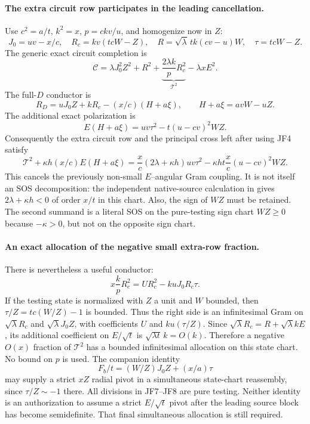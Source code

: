 \paragraph{The extra circuit row participates in the leading cancellation.}
Use $c^2=a/t$, $k^2=x$, $p=ckv/u$, and homogenize now in $Z$:
\[
 J_0=uv-x/c,\quad R_c=kv(tcW-Z),\quad
 R=\sqrt\lambda\,tk(cv-u)W,
 \quad \tau=tcW-Z.
\]
The generic exact circuit completion is
\[
 \mathscr C=\lambda J_0^2Z^2+R^2+
      \underbrace{\frac{2\lambda k}{p}R_c^2}_{\mathcal T^2}
      -\lambda xE^2.
\]
The full-$D$ conductor is
\[
 R_D=uJ_0Z+kR_c-(x/c)(H+a\xi),\qquad
 H+a\xi=avW-uZ.                                  \tag{JF4}
\]
The additional exact polarization is
\[
 E(H+a\xi)=uv\tau^2-t(u-cv)^2WZ.                  \tag{JF5}
\]
Consequently the extra circuit row and the principal cross left after
using JF4 satisfy
\[
 \mathcal T^2+\kappa h(x/c)E(H+a\xi)
 =\frac{x}{c}(2\lambda+\kappa h)uv\tau^2
      -\kappa ht\frac{x}{c}(u-cv)^2WZ.             \tag{JF6}
\]
This cancels the previously non-small $E$--angular Gram coupling.
It is not itself an SOS decomposition: the independent native-source
calculation in 
gives $2\lambda+\kappa h<0$ of order $x/t$ in this chart.
Also, the sign of $WZ$ must be retained. The second summand is a
literal SOS on the pure-testing sign chart $WZ\ge0$ because
$-\kappa>0$, but not on the opposite sign chart.

\paragraph{An exact allocation of the negative small extra-row fraction.}
There is nevertheless a useful conductor:
\[
 x\frac{k}{p}R_c^2
          =U R_c^2-kuJ_0R_c\tau.                   \tag{JF7}
\]
If the testing state is normalized with $Z$ a unit and $W$ bounded,
then $\tau/Z=tc(W/Z)-1$ is bounded. Thus the right side is an
infinitesimal Gram on $\sqrt\lambda R_c$ and
$\sqrt\lambda J_0Z$, with coefficients $U$ and
$ku(\tau/Z)$. Since
$\sqrt\lambda R_c=R+\sqrt\lambda kE$, its additional coefficient
on $E/\sqrt t$ is $\sqrt{\lambda t}\,k=O(k)$.
Therefore a negative $O(x)$ fraction of $\mathcal T^2$ has a bounded
infinitesimal allocation on this state chart. No bound on $p$ is used.
The companion identity
\[
 F_b/t=(W/Z)J_0Z+(x/a)\tau                          \tag{JF8}
\]
may supply a strict $xZ$ radial pivot in a simultaneous state-chart
reassembly, since $\tau/Z\sim-1$ there. All divisions in JF7--JF8
are pure testing. Neither identity is an authorization to assume a
strict $E/\sqrt t$ pivot after the leading source block has become
semidefinite. That final simultaneous allocation is still required.

